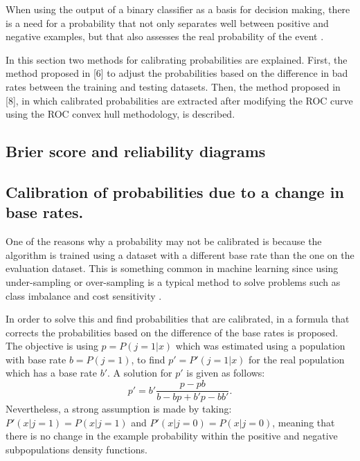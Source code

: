  When using the output of a binary classifier as a basis for decision making,
  there is a need for a probability that not only separates well between 
  positive and negative examples, but that also assesses the real probability of the event 
	\citep{cohen2004}.
  
  In this section two methods for calibrating probabilities are explained.
  First, the method proposed in [6] to adjust the probabilities based on the difference in bad rates
  between the training and testing datasets.
  Then, the method proposed in [8], in which calibrated probabilities are extracted after
  modifying the ROC curve using the ROC convex hull methodology, is described.
  
  \subsection{Brier score and reliability diagrams}
  
  \subsection{Calibration of probabilities due to a change in base rates.}
  One of the reasons why a probability may not be calibrated is because 
  the algorithm is trained using a dataset with a different base rate than the one on
  the evaluation dataset. 
  This is something common in machine learning since
  using under-sampling or over-sampling is a typical method to solve problems such as
  class imbalance and cost sensitivity \citep{Hulse2007}.
  
  In order to solve this and find probabilities that are calibrated, in \citep{Elkan2001} a formula
  that corrects the probabilities based on the difference of the base rates is proposed.
  The objective is using $p=P(j=1|x)$ which was estimated using a population with base rate 
\mbox{$b=P(j=1)$},
  to find $p'=P'(j=1|x)$ for the real population which has a base rate $b'$.
  A solution for $p'$ is given as follows:
  \begin{equation}
  p'=b'\frac{p-pb}{b-bp+b'p-bb'}.
  \label{cal_prob_br}
  \end{equation}
  Nevertheless, a strong assumption is made by taking: 
  \mbox{$P'(x|j=1)=P(x|j=1)$} and \mbox{$P'(x|j=0)=P(x|j=0)$}, meaning that there
  is no change in the example probability within the positive and negative
  subpopulations density functions.
  
